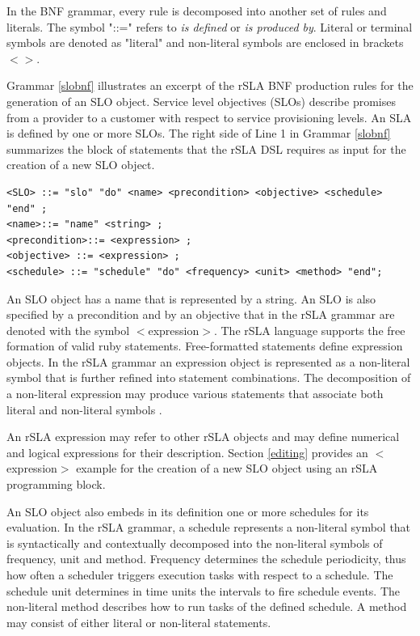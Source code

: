 In the BNF grammar, every rule is decomposed into another set of rules and literals. The symbol "::=" refers to \textit{is defined} or \textit{is produced by}. Literal or terminal symbols are denoted as "literal" and non-literal symbols are enclosed in brackets $<>$.

Grammar \ref{slobnf} illustrates an excerpt of the rSLA BNF production rules for the generation of an SLO object. Service level objectives (SLOs) describe promises from a provider to a customer with respect to service provisioning levels\cite{wsla}. An SLA is defined by one or more SLOs. The right side of Line 1 in Grammar \ref{slobnf} summarizes the block of statements that the rSLA DSL requires as input for the creation of a new SLO object.
\begin{lstlisting}[caption= Service level objective (SLO) production rules, label=slobnf]
<SLO> ::= "slo" "do" <name> <precondition> <objective> <schedule> "end" ;
<name>::= "name" <string> ;
<precondition>::= <expression> ;
<objective> ::= <expression> ;
<schedule> ::= "schedule" "do" <frequency> <unit> <method> "end";
\end{lstlisting} 
An SLO object has a name that is represented by a string. An SLO is also specified by a precondition and by an objective that in the rSLA grammar are denoted with the symbol $<$expression$>$. 
The rSLA language supports the free formation of valid ruby statements. Free-formatted statements define expression objects. In the rSLA grammar an expression object is represented as a non-literal symbol that is further refined into statement combinations. The decomposition of a non-literal expression may produce various statements that associate both literal and non-literal symbols . 

An rSLA expression may refer to other rSLA objects and may define numerical and logical expressions for their description. Section \ref{editing} provides an $<$expression$>$ example for the creation of a new SLO object using an rSLA programming block.

An SLO object also embeds in its definition one or more schedules for its evaluation. In the rSLA grammar, a schedule represents a non-literal symbol that is syntactically and contextually decomposed into the non-literal symbols of frequency, unit and method. Frequency determines the schedule periodicity, thus how often a scheduler triggers execution tasks with respect to a schedule. The schedule unit determines in time units the intervals to fire schedule events. The non-literal method describes how to run tasks of the defined schedule. A method may consist of either literal or non-literal statements.

